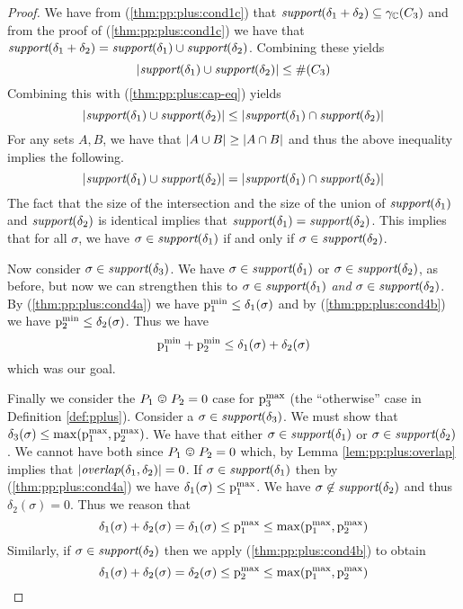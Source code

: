 \begin{proof}
We have from (\ref{thm:pp:plus:cond1c}) that $\textit{support}(\delta_1
+ \delta_2) \subseteq \gamma_{\mathbb{C}}(C_{3})$ and from the proof of
(\ref{thm:pp:plus:cond1c}) we have that $\textit{support}(\delta_1 + \delta_2)
= \textit{support}(\delta_1) \cup \textit{support}(\delta_2)$.  Combining these yields
\[\left| \textit{support}(\delta_1) \cup \textit{support}(\delta_2) \right| \leq \#(C_{3})\]
Combining this with (\ref{thm:pp:plus:cap-eq}) yields
\[\left| \textit{support}(\delta_1) \cup \textit{support}(\delta_2) \right| \leq \left| \textit{support}(\delta_1) \cap \textit{support}(\delta_2) \right|\]
For any sets $A, B$, we have that $\left| A \cup
B \right| \geq \left| A \cap B \right|$ and thus the above inequality implies the
following.
\[\left| \textit{support}(\delta_1) \cup \textit{support}(\delta_2) \right| = \left| \textit{support}(\delta_1) \cap \textit{support}(\delta_2) \right|\]
The fact that the size of the intersection and the size of the union
of $\textit{support}(\delta_1)$ and $\textit{support}(\delta_2)$ is identical implies that
$\textit{support}(\delta_1) = \textit{support}(\delta_2)$.  This implies that for all
$\sigma$, we have $\sigma \in \textit{support}(\delta_1)$ if and only if
$\sigma \in \textit{support}(\delta_2)$.

Now consider $\sigma \in \textit{support}(\delta_3)$.  We have
$\sigma \in \textit{support}(\delta_1)$ or $\sigma \in \textit{support}(\delta_2)$, as
before, but now we can strengthen this to
$\sigma \in \textit{support}(\delta_1)$ \emph{and}
$\sigma \in \textit{support}(\delta_2)$.  By (\ref{thm:pp:plus:cond4a}) we have
$\mathrm{p}^\mathrm{min}_{1} \leq \delta_1(\sigma)$ and by (\ref{thm:pp:plus:cond4b}) we
have $\mathrm{p}^\mathrm{min}_{2} \leq \delta_2(\sigma)$.  Thus we have
\[\mathrm{p}^\mathrm{min}_{1} + \mathrm{p}^\mathrm{min}_{2} \leq \delta_1(\sigma) + \delta_2(\sigma)\]
which was our goal.

Finally we consider the $\optoverlap{\ppa}{\ppb} = 0$ case for
$\mathrm{p}^\mathrm{max}_{3}$ (the ``otherwise'' case in Definition \ref{def:pplus}).
Consider a $\sigma \in \textit{support}(\delta_3)$.  We must show that
$\delta_3(\sigma) \leq \max(\mathrm{p}^\mathrm{max}_{1},\mathrm{p}^\mathrm{max}_{2})$.  We have that either
$\sigma \in \textit{support}(\delta_1)$ or $\sigma \in \textit{support}(\delta_2)$.  We
cannot have both since $\optoverlap{\ppa}{\ppb} = 0$ which, by
Lemma \ref{lem:pp:plus:overlap} implies that
$\left| \textit{overlap}(\delta_1,\delta_2) \right| = 0$.  If
$\sigma \in \textit{support}(\delta_1)$ then by (\ref{thm:pp:plus:cond4a}) we
have $\delta_1(\sigma) \leq \mathrm{p}^\mathrm{max}_{1}$.  We have
$\sigma \not\in \textit{support}(\delta_2)$ and thus $\delta_2(\sigma) = 0$.
Thus we reason that
\[\delta_1(\sigma) + \delta_2(\sigma) = \delta_1(\sigma) \leq \mathrm{p}^\mathrm{max}_{1} \leq \max(\mathrm{p}^\mathrm{max}_{1},\mathrm{p}^\mathrm{max}_{2})\]
Similarly, if $\sigma \in \textit{support}(\delta_2)$ then we apply (\ref{thm:pp:plus:cond4b}) to obtain
\[\delta_1(\sigma) + \delta_2(\sigma) = \delta_2(\sigma) \leq \mathrm{p}^\mathrm{max}_{2} \leq \max(\mathrm{p}^\mathrm{max}_{1},\mathrm{p}^\mathrm{max}_{2})\]
\end{proof}

